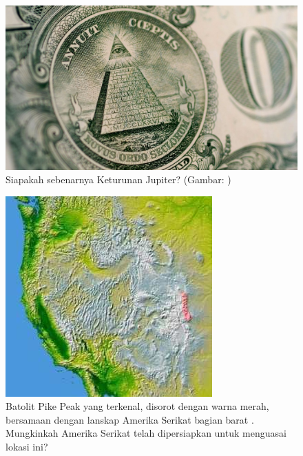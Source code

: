 \documentclass[10pt,twocolumn,letterpaper]{article}
\begin{document}
\begin{figure}[t]
\begin{center}
   \includegraphics[width=1\linewidth]{illuminati.jpg}
\end{center}
   \caption{Siapakah sebenarnya Keturunan Jupiter? (Gambar: \cite{35})}
\label{fig:10}
\label{fig:onecol}
\end{figure}

\begin{figure}[t]

\begin{center}
   \includegraphics[width=1\linewidth]{pike.jpg}
\end{center}
   \caption{Batolit Pike Peak yang terkenal, disorot dengan warna merah, bersamaan dengan lanskap Amerika Serikat bagian barat \cite{36}. Mungkinkah Amerika Serikat telah dipersiapkan untuk menguasai lokasi ini?}
\label{fig:11}
\label{fig:onecol}
\end{figure}
\end{document}
